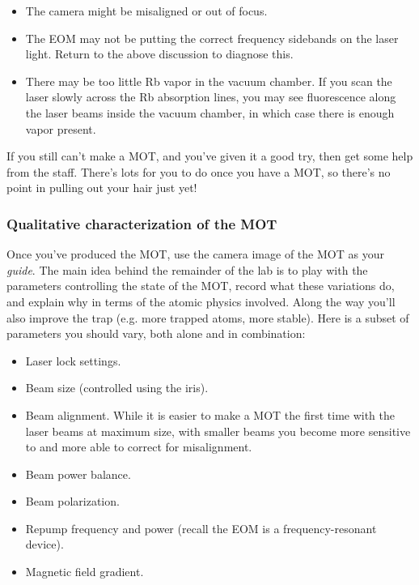 \documentclass{../lab}
\begin{document}
\begin{itemize}
    \item The camera might be misaligned or out of focus.

    \item The EOM may not be putting the correct frequency sidebands on the laser light. Return to the above discussion to diagnose this.

    \item There may be too little Rb vapor in the vacuum chamber. If you scan the laser slowly across the Rb absorption lines, you may see fluorescence along the laser beams inside the vacuum chamber, in which case there is enough vapor present.
\end{itemize}

If you still can't make a MOT, and you've given it a good try, then get some help from the staff. There's lots for you to do once you have a MOT, so there's no point in pulling out your hair just yet!

\subsubsection{Qualitative characterization of the MOT}

Once you've produced the MOT, use the camera image of the MOT as your \emph{guide}. The main idea behind the remainder of the lab is to play with the parameters controlling the state of the MOT, record what these variations do, and explain why in terms of the atomic physics involved. Along the way you'll also improve the trap (e.g. more trapped atoms, more stable). Here is a subset of parameters you should vary, both alone and in combination:

\begin{itemize}
    \item Laser lock settings.

    \item Beam size (controlled using the iris).

    \item Beam alignment. While it is easier to make a MOT the first time with the laser beams at maximum size, with smaller beams you become more sensitive to and more able to correct for misalignment.

    \item Beam power balance.

    \item Beam polarization.

    \item Repump frequency and power (recall the EOM is a frequency-resonant device).

    \item Magnetic field gradient.
\end{itemize}
\end{document}
